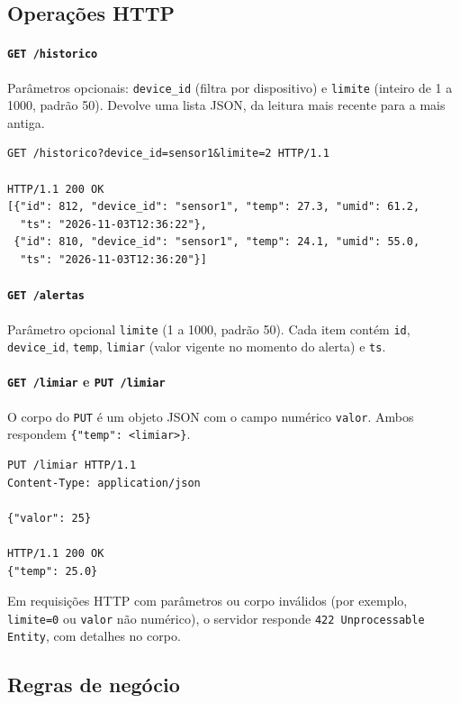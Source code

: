 \documentclass[12pt,a4paper]{article}
\begin{document}
\subsection{Opera\c{c}\~oes HTTP}

\paragraph{\texttt{GET /historico}} Par\^ametros opcionais:
\texttt{device\_id} (filtra por dispositivo) e \texttt{limite} (inteiro de 1 a 1000,
padr\~ao 50). Devolve uma lista JSON, da leitura mais recente para a mais antiga.

\begin{lstlisting}
GET /historico?device_id=sensor1&limite=2 HTTP/1.1

HTTP/1.1 200 OK
[{"id": 812, "device_id": "sensor1", "temp": 27.3, "umid": 61.2,
  "ts": "2026-11-03T12:36:22"},
 {"id": 810, "device_id": "sensor1", "temp": 24.1, "umid": 55.0,
  "ts": "2026-11-03T12:36:20"}]
\end{lstlisting}

\paragraph{\texttt{GET /alertas}} Par\^ametro opcional \texttt{limite} (1 a 1000, padr\~ao 50).
Cada item cont\'em \texttt{id}, \texttt{device\_id}, \texttt{temp}, \texttt{limiar} (valor vigente no
momento do alerta) e \texttt{ts}.

\paragraph{\texttt{GET /limiar} e \texttt{PUT /limiar}} O corpo do \texttt{PUT} \'e um
objeto JSON com o campo num\'erico \texttt{valor}. Ambos respondem
\texttt{\{"temp": <limiar>\}}.

\begin{lstlisting}
PUT /limiar HTTP/1.1
Content-Type: application/json

{"valor": 25}

HTTP/1.1 200 OK
{"temp": 25.0}
\end{lstlisting}

Em requisi\c{c}\~oes HTTP com par\^ametros ou corpo inv\'alidos (por exemplo,
\texttt{limite=0} ou \texttt{valor} n\~ao num\'erico), o servidor responde
\texttt{422 Unprocessable Entity}, com detalhes no corpo.

\subsection{Regras de neg\'ocio}
\end{document}
